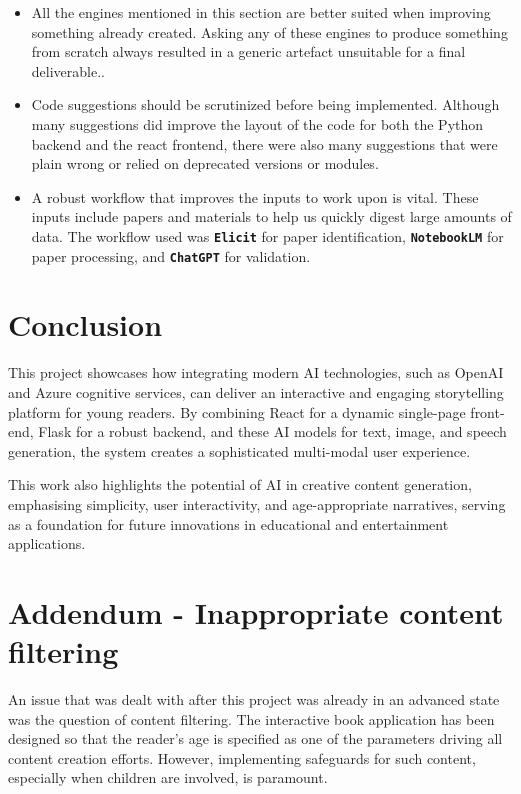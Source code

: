 \documentclass[conference]{IEEEtran}
\begin{document}
	\begin{itemize}
		\item All the engines mentioned in this section are better suited when improving something already created. Asking any of these engines to produce something from scratch always resulted in a generic artefact unsuitable for a final deliverable..
		
		\item Code suggestions should be scrutinized before being implemented. Although many suggestions did improve the layout of the code for both the Python backend and the react frontend, there were also many suggestions that were plain wrong or relied on deprecated versions or modules. 
		
		\item A robust workflow that improves the inputs to work upon is vital. These inputs include papers and materials to help us quickly digest large amounts of data. The workflow used was \textbf{\texttt{Elicit}} for paper identification, \textbf{\texttt{NotebookLM}} for paper processing, and \textbf{\texttt{ChatGPT}} for validation.
	\end{itemize}


	\section{Conclusion}
	
	This project showcases how integrating modern AI technologies, such as OpenAI and Azure cognitive services, can deliver an interactive and engaging storytelling platform for young readers. By combining React for a dynamic single-page front-end, Flask for a robust backend, and these AI models for text, image, and speech generation, the system creates a sophisticated multi-modal user experience. 
	
	This work also highlights the potential of AI in creative content generation, emphasising simplicity, user interactivity, and age-appropriate narratives, serving as a foundation for future innovations in educational and entertainment applications.
	
	\section{Addendum - Inappropriate content filtering}
	
	An issue that was dealt with after this project was already in an advanced state was the question of content filtering. The interactive book application has been designed so that the reader's age is specified as one of the parameters driving all content creation efforts. However, implementing safeguards for such content, especially when children are involved, is paramount.
	
\end{document}
